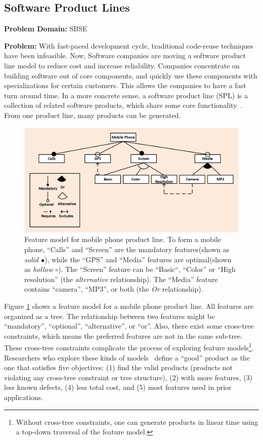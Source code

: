 \documentclass[table, xcdraw, sigconf,review, anonymous]{acmart}
\begin{document}
    \subsection{Software Product Lines}
    \textbf{Problem Domain: } SBSE
    
    \noindent\textbf{Problem:} With fast-paced development cycle, traditional code-reuse techniques have been infeasible. Now, Software companies are moving a software product line model to reduce cost and increase reliability. Companies concentrate on building software out of core components, and quickly use these components with specializations for certain customers. This allows the companies to have a fast turn around time. In a more concrete sense, a software product line (SPL) is a collection of related software products, which share some core functionality~\cite{harman2014search}. From one product line, many products can be generated. 
    
    \begin{figure}[!t]
 \includegraphics[width=\linewidth]{img/ft.png}
\caption{Feature model for mobile phone product line. To form a mobile phone, ``Calls'' and ``Screen'' are the mandatory features(shown as \textit{solid $\bullet$}), while the ``GPS'' and ``Media'' features are optimal(shown as \textit{hollow $\circ$}). The ``Screen'' feature can be ``Basic``, ``Color'' or ``High resolution'' (the \textit{alternative} relationship). The ``Media'' feature contains ``camera'', ``MP3'', or both (the \textit{Or} relationship).}
\label{fig:mobile}
\end{figure}


Figure \ref{fig:mobile} shows a feature model for a mobile phone
product line. All features are organized as a tree. The relationship
between two features might be ``mandatory'', ``optional'',
``alternative'', or ``or''. Also, there exist some cross-tree constraints, which means the preferred features are not in the same sub-tree. These cross-tree constraints complicate the process of exploring feature models\footnote{Without cross-tree constraints, one can generate products in linear time using a top-down traversal of the feature model.}. 
Researchers who explore these kinds of models~\cite{sayyad13a, sayyad13b, harman2014search, henard2015combining}
define a ``good'' product as the one that satisfies five objectives:
(1) find the valid products (products not violating any cross-tree constraint or tree structure), (2) with more features, (3) less known defects, (4) less total cost, and (5) most features used in prior applications.
\end{document}
